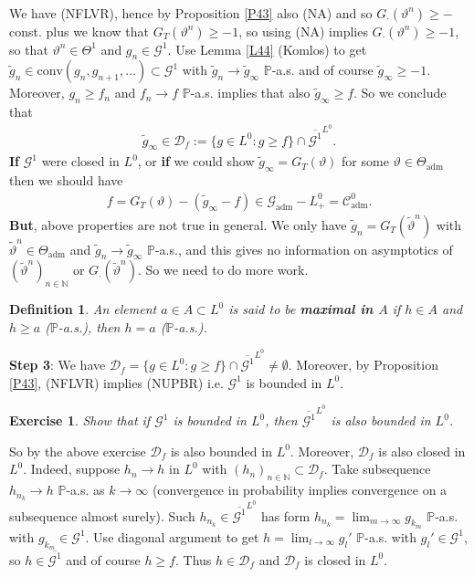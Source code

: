 \documentclass[12pt,a4paper, twoside]{article}
\newtheorem{defn}{Definition}[section]
\newtheorem{exe}{Exercise}[section]
\theoremstyle{definition}
\newcommand{\PP}{\mathbb{P}} %
\begin{document}
\\
We have (NFLVR), hence by Proposition \ref{P43} also (NA) and so $G_\cdot( \vartheta^n) \geq -$const. plus we know that $G_T( \vartheta^n) \geq -1$, so using (NA) implies $G_\cdot ( \vartheta^n) \geq -1$, so that $\vartheta^n \in \Theta^1$ and $g_n \in \mathcal{G}^1$. Use Lemma \ref{L44} (Komlos) to get $\widetilde{g}_n \in \text{conv}(g_n, g_{n+1}, \dots ) \subset \mathcal{G}^1$ with $\widetilde{g}_n \to \widetilde{g}_\infty$ $\PP$-a.s. and of course $\widetilde{g}_\infty \geq -1$. Moreover, $g_n \geq f_n$ and $f_n \to f$ $\PP$-a.s. implies that also $\widetilde{g}_\infty \geq f$. So we conclude that
\begin{align*}
\widetilde{g}_\infty \in \mathcal{D}_f:= \{ g \in L^0: g \geq f\} \cap \overline{\mathcal{G}^1}^{L^0}.
\end{align*}
\textbf{If} $\mathcal{G}^1$ were closed in $L^0$, or \textbf{if} we could show $\widetilde{g}_\infty = G_T( \vartheta)$ for some $\vartheta \in \Theta_\text{adm}$ then we should have 
\begin{align*}
f= G_T( \vartheta)- ( \widetilde{g}_\infty -f) \in \mathcal{G}_\text{adm}-L_+^0= \mathcal{C}_\text{adm}^0.
\end{align*}
\textbf{But}, above properties are not true in general. We only have $\widetilde{g}_n = G_T( \widetilde{\vartheta}^n)$ with $\widetilde{\vartheta}^n \in \Theta_\text{adm}$ and $\widetilde{g}_n \to \widetilde{g}_\infty$ $\PP$-a.s., and this gives no information on asymptotics of $( \widetilde{\vartheta}^n)_{n \in \mathbb{N}}$ or $G_\cdot ( \widetilde{\vartheta}^n)$. So we need to do more work. 
\newpage
\begin{defn} An element $a \in A \subset L^0$ is said to be \textbf{maximal in $A$} if $h \in A$ and $h \geq a$ ($\PP$-a.s.), then $h=a$ ($\PP$-a.s.).
\end{defn}
\noindent \textbf{Step 3}: We have $\mathcal{D}_f = \{ g \in L^0: g \geq f \} \cap \overline{ \mathcal{G}^1}^{L^0} \neq \emptyset$. Moreover, by Proposition \ref{P43}, (NFLVR) implies (NUPBR) i.e. $\mathcal{G}^1$ is bounded in $L^0$. 
\begin{exe} Show that if $\mathcal{G}^1$ is bounded in $L^0$, then $\overline{\mathcal{G}^1}^{L^0}$ is also bounded in $L^0$.
\end{exe}
\noindent So by the above exercise $\mathcal{D}_f$ is also bounded in $L^0$. Moreover, $\mathcal{D}_f$ is also closed in $L^0$. Indeed, suppose $h_n \to h$ in $L^0$ with $(h_n)_{n \in \mathbb{N}} \subset \mathcal{D}_f$. Take subsequence $h_{n_k} \to h$ $\PP$-a.s. as $k \to \infty$ (convergence in probability implies convergence on a subsequence almost surely). Such $h_{n_k} \in \overline{\mathcal{G}^1}^{L^0}$ has form $h_{n_k} = \lim_{m \to \infty} g_{k_m}$ $\PP$-a.s. with $g_{k_m} \in \mathcal{G}^1$. Use diagonal argument to get $h = \lim_{l \to \infty} g_l'$ $\PP$-a.s. with $g_l' \in \mathcal{G}^1$, so $h \in \overline{\mathcal{G}^1}$ and of course $h \geq f$. Thus $h \in \mathcal{D}_f$ and $\mathcal{D}_f$ is closed in $L^0$. 
\end{document}
